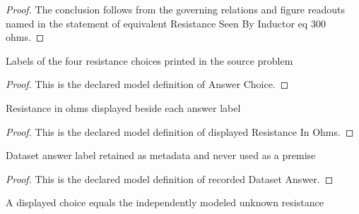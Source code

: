 \begin{proof}
  The conclusion follows from the governing relations and figure readouts named in the statement of equivalent Resistance Seen By Inductor eq 300 ohms.
\end{proof}
\begin{definition}
  \label{def:physics:phyx-mini-0928:phyxminiproblems-problemphyxmini0928-answerchoice}
  Labels of the four resistance choices printed in the source problem
\end{definition}
\begin{proof}
  This is the declared model definition of Answer Choice.
\end{proof}
\begin{definition}
  \label{def:physics:phyx-mini-0928:phyxminiproblems-problemphyxmini0928-answerchoice-displayedresistanceinohms}
  Resistance in ohms displayed beside each answer label
\end{definition}
\begin{proof}
  This is the declared model definition of displayed Resistance In Ohms.
\end{proof}
\begin{definition}
  \label{def:physics:phyx-mini-0928:phyxminiproblems-problemphyxmini0928-recordeddatasetanswer}
  Dataset answer label retained as metadata and never used as a premise
\end{definition}
\begin{proof}
  This is the declared model definition of recorded Dataset Answer.
\end{proof}
\begin{definition}
  \label{def:physics:phyx-mini-0928:phyxminiproblems-problemphyxmini0928-answermatchesunknownresistance}
  A displayed choice equals the independently modeled unknown resistance
\end{definition}
